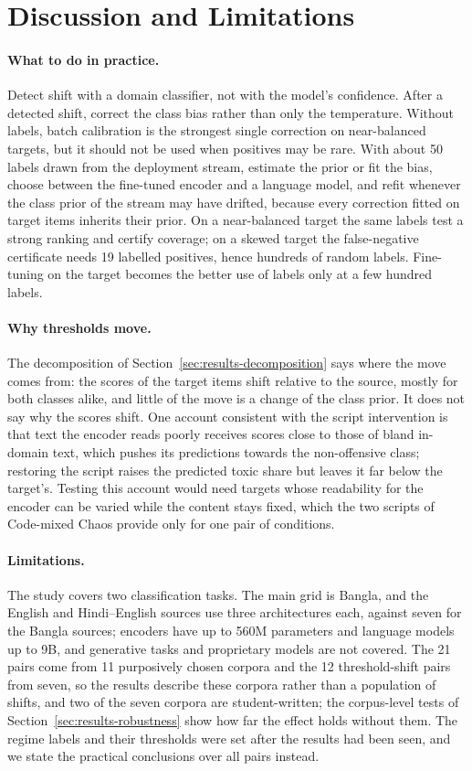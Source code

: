 \section{Discussion and Limitations}
\label{sec:discussion}

\paragraph{What to do in practice.}
Detect shift with a domain classifier, not with the model's confidence. After a detected shift, correct the class bias
rather than only the temperature. Without labels, batch calibration is the strongest single correction on
near-balanced targets, but it should not be used when positives may be rare. With about 50 labels drawn from the
deployment stream, estimate the prior or fit the bias, choose between the fine-tuned encoder and a language model, and
refit whenever the class prior of the stream may have drifted, because every correction fitted on target items
inherits their prior. On a near-balanced target the same labels test a strong ranking and certify coverage; on a skewed
target the false-negative certificate needs 19 labelled positives, hence hundreds of random labels. Fine-tuning on the
target becomes the better use of labels only at a few hundred labels.

\paragraph{Why thresholds move.}
The decomposition of Section~\ref{sec:results-decomposition} says where the move comes from: the scores of the target
items shift relative to the source, mostly for both classes alike, and little of the move is a change of the class
prior. It does not say why the scores shift. One account consistent with the script intervention is that text the
encoder reads poorly receives scores close to those of bland in-domain text, which pushes its predictions towards the
non-offensive class; restoring the script raises the predicted toxic share but leaves it far below the target's.
Testing this account would need targets whose readability for the encoder can be varied while the content stays fixed,
which the two scripts of Code-mixed Chaos provide only for one pair of conditions.

\paragraph{Limitations.}
The study covers two classification tasks. The main grid is Bangla, and the English and Hindi--English sources use
three architectures each, against seven for the Bangla sources; encoders have up to 560M parameters and language
models up to 9B, and generative tasks and proprietary models are not covered. The 21 pairs come from 11 purposively
chosen corpora and the 12 threshold-shift pairs from seven, so the results describe these corpora rather than a
population of shifts, and two of the seven corpora are student-written; the corpus-level tests of
Section~\ref{sec:results-robustness} show how far the effect holds without them. The regime labels and their thresholds
were set after the results had been seen, and we state the practical conclusions over all pairs instead.

